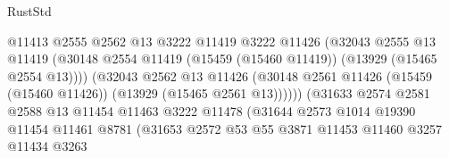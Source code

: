 \begin{lexlean}{RustStd}
\begin{coremodule}
                                          @11413
                                          @2555
                                          @2562
                                          @13
                                          @3222
                                          @11419
                                          @3222
                                          @11426
                                          (@32043
                                            @2555
                                            @13
                                            @11419
                                            (@30148
                                              @2554
                                              @11419
                                              (@15459 (@15460 @11419))
                                              (@13929 (@15465 @2554 @13))))
                                          (@32043
                                            @2562
                                            @13
                                            @11426
                                            (@30148
                                              @2561
                                              @11426
                                              (@15459 (@15460 @11426))
                                              (@13929 (@15465 @2561 @13))))))
                                      (@31633
                                        @2574
                                        @2581
                                        @2588
                                        @13
                                        @11454
                                        @11463
                                        @3222
                                        @11478
                                        (@31644
                                          @2573
                                          @1014
                                          @19390
                                          @11454
                                          @11461
                                          @8781
                                          (@31653
                                            @2572
                                            @53
                                            @55
                                            @3871
                                            @11453
                                            @11460
                                            @3257
                                            @11434
                                            @3263

\end{coremodule}
\end{lexlean}

